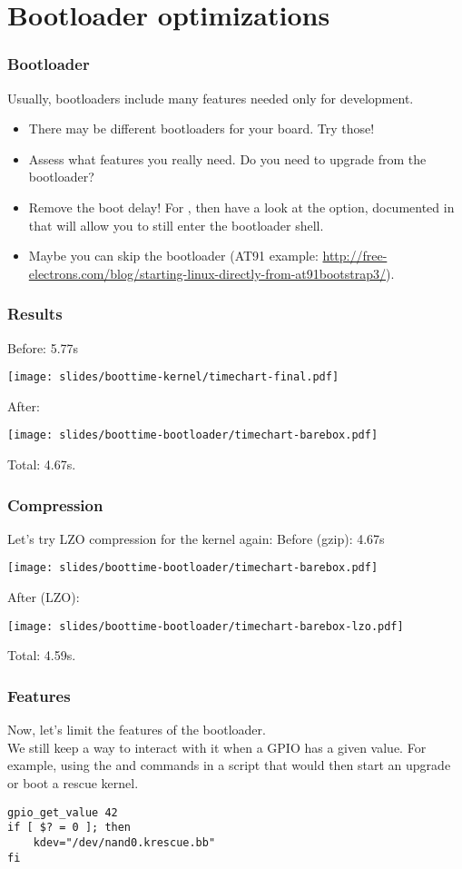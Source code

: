 \section{Bootloader optimizations}
\begin{frame}
\frametitle{Bootloader}
Usually, bootloaders include many features needed only for
development.
\begin{itemize}
	\item There may be different bootloaders for your board. Try
		those!
	\item Assess what features you really need. Do you need to
		upgrade from the bootloader?
	\item Remove the boot delay! For , then have a look
		at the  option, documented in
		 that will allow you to still enter
		the bootloader shell.
	\item Maybe you can skip the bootloader (AT91 example: 
                \url{http://free-electrons.com/blog/starting-linux-directly-from-at91bootstrap3/}).
\end{itemize}
\end{frame}

\begin{frame}
\frametitle{Results}
Before: 5.77s
\begin{center}
    \texttt{[image: slides/boottime-kernel/timechart-final.pdf]}
\end{center}
After:
\begin{center}
    \texttt{[image: slides/boottime-bootloader/timechart-barebox.pdf]}
\end{center}
Total: 4.67s.
\end{frame}

\begin{frame}
\frametitle{Compression}
Let's try LZO compression for the kernel again:
Before (gzip): 4.67s
\begin{center}
    \texttt{[image: slides/boottime-bootloader/timechart-barebox.pdf]}
\end{center}
After (LZO):
\begin{center}
    \texttt{[image: slides/boottime-bootloader/timechart-barebox-lzo.pdf]}
\end{center}
Total: 4.59s.
\end{frame}

\begin{frame}[fragile]
\frametitle{Features}
Now, let's limit the features of the bootloader.\\
We still keep a way to interact with it when a GPIO has a given value.
For example, using the  and
 commands in a script that would then start an
upgrade or boot a rescue kernel.
\begin{block}{}
\begin{verbatim}
gpio_get_value 42
if [ $? = 0 ]; then
    kdev="/dev/nand0.krescue.bb"
fi
\end{verbatim}
\end{block}
\end{frame}

